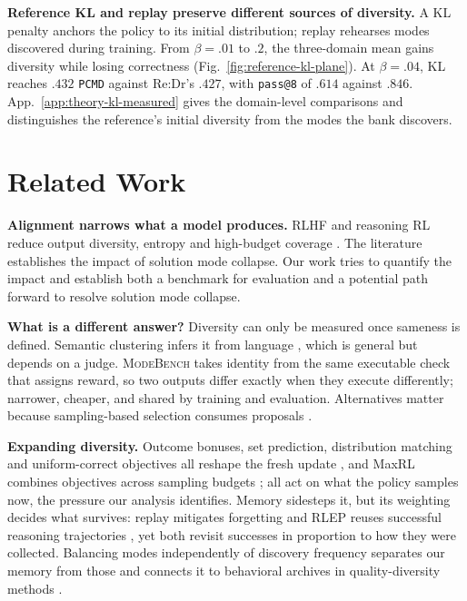 \documentclass{article}
\newcommand{\1}{\mathbf 1}
\newcommand{\mb}{\textsc{ModeBench}}
\newcommand{\pmd}{\texttt{PCMD}}
\theoremstyle{remark}
\theoremstyle{definition}
\theoremstyle{plain}
\begin{document}
\textbf{Reference KL and replay preserve different sources of diversity.}
A KL penalty anchors the policy to its initial distribution; replay rehearses modes discovered during training. From $\beta=.01$ to $.2$, the three-domain mean gains diversity while losing correctness (Fig.~\ref{fig:reference-kl-plane}). At $\beta=.04$, KL reaches $.432$ \pmd{} against Re:Dr's $.427$, with \texttt{pass@8} of $.614$ against $.846$. App.~\ref{app:theory-kl-measured} gives the domain-level comparisons and distinguishes the reference's initial diversity from the modes the bank discovers.

\section{Related Work}
\label{sec:related}

\textbf{Alignment narrows what a model produces.} RLHF and reasoning RL reduce
output diversity, entropy and high-budget coverage
\citep{kirk2024understanding,dang2025diversity,cui2025entropy,yue2025rlvrlimit}.
The literature establishes the impact of solution mode collapse. Our work tries to quantify the impact and establish both a benchmark for evaluation and a potential path forward to resolve solution mode collapse.

\textbf{What is a different answer?}
Diversity can only be measured once sameness is defined.
Semantic clustering infers it from language \citep{farquhar2024detecting}, which is general but depends on a judge.
\mb{} takes identity from the same executable check that assigns reward, so two outputs differ exactly when they execute differently; narrower, cheaper, and shared by training and evaluation.
Alternatives matter because sampling-based selection consumes proposals
\citep{brown2024monkeys,snell2024testtime,cobbe2021training,lightman2023lets}.

\textbf{Expanding diversity.}
Outcome bonuses, set prediction, distribution matching and uniform-correct objectives all reshape the fresh update \citep{song2025outcome,chen2025passktraining,li2025divergence,li2026setpo,li2026distribution,lochab2026ucpo}, and MaxRL combines objectives across sampling budgets \citep{tajwar2026maxrl};
all act on what the policy samples now, the pressure our analysis
identifies.
Memory sidesteps it, but its weighting decides what survives: replay mitigates forgetting \citep{lin1992selfimproving,rolnick2019replay} and RLEP reuses successful reasoning trajectories \citep{zhang2025rlep}, yet both revisit successes in proportion to how they were collected.
Balancing modes independently of discovery frequency separates our memory from those and connects it to behavioral archives in quality-diversity methods \citep{mouret2015illuminating,ecoffet2021return}.
\end{document}
